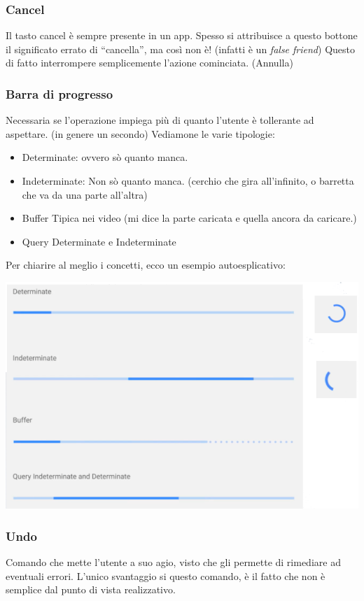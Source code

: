 \documentclass[oneside]{book}
\begin{document}
			\subsubsection{Cancel} \label{CancelAndroid}
				Il tasto cancel è sempre presente in un app. Spesso si attribuisce a questo bottone il significato errato di ``cancella'', ma così non è! (infatti è un \emph{false friend}) Questo di fatto interrompere semplicemente l'azione cominciata. (Annulla)

	 		\subsubsection{Barra di progresso} \label{BarraDiProgressoAndroid}
				Necessaria se l'operazione impiega più di quanto l'utente è tollerante ad aspettare. (in genere un secondo) Vediamone le varie tipologie:
				\begin{itemize}
				\item Determinate: ovvero sò quanto manca.
				\item Indeterminate: Non sò quanto manca. (cerchio che gira all'infinito, o barretta che va da una parte all'altra)
				\item Buffer Tipica nei video (mi dice la parte caricata e quella ancora da caricare.)
				\item Query Determinate e Indeterminate
				\end{itemize}
				Per chiarire al meglio i concetti, ecco un esempio autoesplicativo:
				\begin{center}
				\includegraphics[height = 50 mm]{images/progressBar.png}
				\end{center}

			\subsubsection{Undo}
				Comando che mette l'utente a suo agio, visto che gli permette di rimediare ad eventuali errori. L'unico svantaggio si questo comando, è il fatto che non è semplice dal punto di vista realizzativo.
\end{document}

